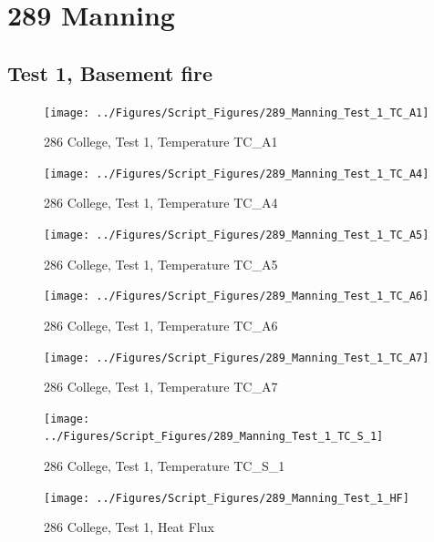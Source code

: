 \documentclass[12pt,oneside]{book}
\begin{document}
\clearpage


\section{289 Manning}

\subsection{Test 1, Basement fire}

\begin{figure}[!ht]
\texttt{[image: ../Figures/Script\_Figures/289\_Manning\_Test\_1\_TC\_A1]}
\caption{286 College, Test 1, Temperature TC\_A1}
\label{fig:289_Manning_Test_1_TC_A1}
\end{figure}

\begin{figure}[!ht]
\texttt{[image: ../Figures/Script\_Figures/289\_Manning\_Test\_1\_TC\_A4]}
\caption{286 College, Test 1, Temperature TC\_A4}
\label{fig:289_Manning_Test_1_TC_A4}
\end{figure}

\begin{figure}[!ht]
\texttt{[image: ../Figures/Script\_Figures/289\_Manning\_Test\_1\_TC\_A5]}
\caption{286 College, Test 1, Temperature TC\_A5}
\label{fig:289_Manning_Test_1_TC_A5}
\end{figure}

\begin{figure}[!ht]
\texttt{[image: ../Figures/Script\_Figures/289\_Manning\_Test\_1\_TC\_A6]}
\caption{286 College, Test 1, Temperature TC\_A6}
\label{fig:289_Manning_Test_1_TC_A6}
\end{figure}

\begin{figure}[!ht]
\texttt{[image: ../Figures/Script\_Figures/289\_Manning\_Test\_1\_TC\_A7]}
\caption{286 College, Test 1, Temperature TC\_A7}
\label{fig:289_Manning_Test_1_TC_A7}
\end{figure}

\begin{figure}[!ht]
\texttt{[image: ../Figures/Script\_Figures/289\_Manning\_Test\_1\_TC\_S\_1]}
\caption{286 College, Test 1, Temperature TC\_S\_1}
\label{fig:289_Manning_Test_1_TC_S_1}
\end{figure}

\begin{figure}[!ht]
\texttt{[image: ../Figures/Script\_Figures/289\_Manning\_Test\_1\_HF]}
\caption{286 College, Test 1, Heat Flux}
\label{fig:289_Manning_Test_1_HF}
\end{figure}
\end{document}
